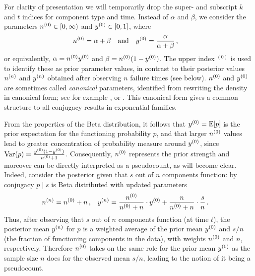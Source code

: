 \documentclass[12pt, a4paper]{elsarticle}
\newcommand{\bs}[1]{\boldsymbol{#1}}
\renewcommand{\vec}[1]{{\bs#1}}
\newcommand{\uz}{^{(0)}} %
\newcommand{\E}{\operatorname{E}}
\newcommand{\V}{\operatorname{Var}}
\begin{document}
For clarity of presentation we will temporarily drop the super- and subscript $k$ and $t$ indices for component type and time.
Instead of $\alpha$ and $\beta$, we consider the parameters $\nz \in [0, \infty)$ and $\yz \in [0,1]$, where
\begin{align}
\nz &= \alpha + \beta &
&\text{and} &
\yz &= \frac{\alpha}{\alpha + \beta} \,,
\label{eq:reparam}
\end{align}
or equivalently, $\alpha = \nz\yz$ and $\beta = \nz(1-\yz)$.
The upper index ${}\uz$ is used to identify these as prior parameter values,
in contrast to their posterior values $n^{(n)}$ and $y^{(n)}$
obtained after observing $n$ failure times (see below).
$\nz$ and $\yz$ are sometimes called \emph{canonical} parameters,
identified from rewriting the density in canonical form;
see for example \cite[pp.~202 and 272f]{2000:bernardosmith}, or \cite[\S 1.2.3.1]{2013:diss-gw}.
This canonical form gives a common structure to all conjugacy results in exponential families.

From the properties of the Beta distribution,
it follows that $\yz = \E[p]$ is the prior expectation for the functioning probability $p$,
and that larger $\nz$ values lead to greater concentration of probability measure around $\yz$,
since $\V(p) = \frac{\yz (1-\yz)}{\nz + 1}$.
Consequently, $\nz$ represents the prior strength and moreover can be directly interpreted as a pseudocount, as will become clear.
Indeed, consider the posterior given that $s$ out of $n$ components function:
by conjugacy
$p \mid s$ is Beta distributed with updated parameters
\begin{align}
\nn &= \nz + n\,, &
\yn &= \frac{\nz}{\nz + n} \cdot \yz + \frac{n}{\nz + n} \cdot \frac{s}{n}\,.
\label{eq:nyupdate}
\end{align}
Thus, after observing that $s$ out of $n$ components function (at time $t$),
the posterior mean $y^{(n)}$ for $p$ is a weighted average of
the prior mean $\yz$ and $s/n$ (the fraction of functioning components in the data),
with weights $\nz$ and $n$, respectively.
Therefore $\nz$ takes on the same role for the prior mean $\yz$
as the sample size $n$ does for the observed mean $s/n$,
leading to the notion of it being a pseudocount.
\end{document}
